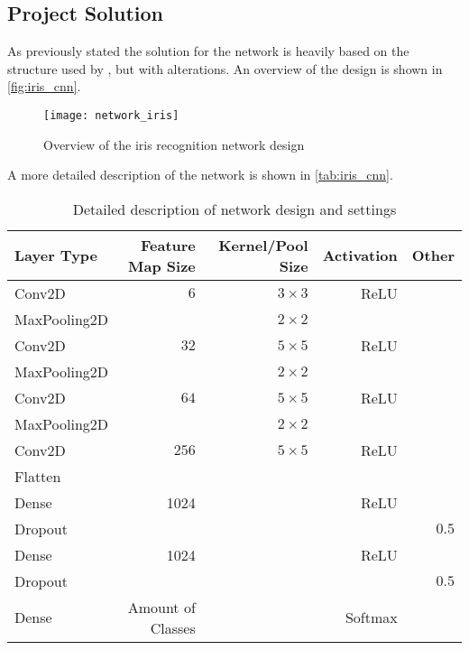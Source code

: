 \subsection{Project Solution}
As previously stated the solution for the network is heavily based on the structure used by \cite{Al-Waisy2017}, but with alterations. An overview of the design is shown in \autoref{fig:iris_cnn}.

\begin{figure}[H]
	\centering
	\texttt{[image: network\_iris]}
	\caption{Overview of the iris recognition network design}
	\label{fig:iris_cnn}
\end{figure}

A more detailed description of the network is shown in \autoref{tab:iris_cnn}.

\begin{table}[H]
	\centering
	\caption{Detailed description of network design and settings}
	\label{tab:iris_cnn}
	\begin{tabular}{lrrrr}
		\textbf{Layer Type}   & \textbf{Feature Map Size}  & \textbf{Kernel/Pool Size} & \textbf{Activation} & \textbf{Other} \\ \hline
		Conv2D       & $6$               & $3\times3$       & ReLU       &       \\
		\rowcolor{lightGrey} 
		MaxPooling2D &                   & $2\times2$       &            &       \\
		Conv2D       & $32$              & $5\times5$       & ReLU       &       \\
		\rowcolor{lightGrey} 
		MaxPooling2D &                   & $2\times2$       &            &       \\
		Conv2D       & $64$              & $5\times5$       & ReLU       &       \\
		\rowcolor{lightGrey} 
		MaxPooling2D &                   & $2\times2$       &            &       \\
		Conv2D       & $256$             & $5\times5$       & ReLU       &       \\
		\rowcolor{lightGrey} 
		Flatten      &                   &                  &            &       \\
		Dense        & 1024              &                  & ReLU           &       \\
		\rowcolor{lightGrey} 
		Dropout      &                   &                  &            & $0.5$ \\
		Dense        & 1024              &                  & ReLU           &       \\
		\rowcolor{lightGrey} 
		Dropout      &                   &                  &            & $0.5$ \\
		Dense        & Amount of Classes &                  & Softmax   &      
	\end{tabular}
\end{table}

